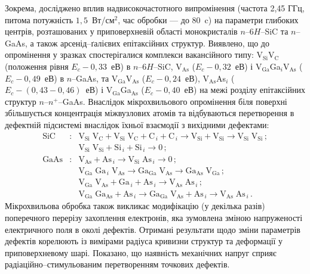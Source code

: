 Зокрема, досліджено вплив надвисокочастотного випромінення (частота 2,45 ГГц, питома потужність  $1,5$~Вт/см$^2$, час обробки --- до 80~c) на параметри глибоких центрів, розташованих у приповерхневій області монокристалів $n$--6$H$--SiC та $n$--GaAs, а також арсенід--ґалієвих епітаксійних структур.
Виявлено, що до опромінення у зразках спостерігалися комплекси вакансійного типу:
%
V$_\text{Si}$V$_\text{C}$ (положення рівня $E_c-0,33$~еВ) в $n$--6$H$--SiC,
V$_\text{As}$ ($E_c-0,32$~еВ) і V$_\text{Ga}$Ga$_i$V$_\text{As}$ ($E_c-0,49$~еВ) в $n$--GaAs,
та V$_\text{Ga}$V$_\text{As}$ ($E_c-0,24$~еВ), V$_\text{As}$As$_i$ ($E_c-(0,43-0,46)$~еВ) і
 V$_\text{Ga}$Ga$_\text{As}$ ($E_c-0,40$~еВ) на межі розділу епітаксійних структур $n$--$n^+$--GaAs.
Внаслідок мікрохвильового опромінення біля поверхні збільшується концентрація міжвузлових атомів та відбуваються перетворення в дефектній
підсистемі внаслідок їхньої взаємодії з вихідними дефектами:
\begin{eqnarray*}
  \text{SiC}&:&\text{V}_\text{Si}\;\text{V}_\text{C}+\text{V}_\text{Si}\;\text{V}_\text{C}+\text{C}_{\,i}+ \text{C}_{\,i} \rightarrow \text{V}_\text{Si}+ \text{V}_\text{Si}\rightarrow \text{V}_\text{Si}\;\text{V}_\text{Si}\,;\\
  &&\text{V}_\text{Si}\;\text{V}_\text{Si}+\text{Si}_{\,i}+ \text{Si}_{\,i} \rightarrow 0\,;\\
  \text{GaAs}&:&\text{V}_\text{As}+ \text{As}_{\,i} \rightarrow\text{V}_\text{Si}\;\text{As}_{\,i} \rightarrow 0\,;\\
   &&  \text{V}_\text{Ga}\;\text{Ga}_{\,i}\;\text{V}_\text{As}\rightarrow \text{Ga}_\text{Ga}\;\text{V}_\text{As}
  \rightarrow \text{Ga}_\text{As}\;\text{V}_\text{Ga} \,;\\
  &&\text{V}_\text{Ga}\;\text{V}_\text{As}+\text{Ga}_{\,i}+\text{As}_{\,i} \rightarrow \text{V}_\text{As}\;\text{As}_{\,i}\,;\\
  &&  \text{V}_\text{Ga}\;\text{Ga}_\text{As}+\text{As}_{\,i} \rightarrow
  \text{Ga}_\text{Ga}\;\text{V}_\text{As}+\text{As}_{\,i} \rightarrow
  \text{V}_\text{As}\;\text{As}_{\,i}\,.
\end{eqnarray*}
Мікрохвильова обробка також викликає модифікацію (у декілька разів) поперечного перерізу захоплення електронів,
яка зумовлена зміною напруженості електричного поля в околі дефектів.
Отримані результати щодо зміни параметрів дефектів корелюють із вимірами радіуса кривизни структур та деформації у приповерхневому шарі.
Показано, що наявність механічних напруг сприяє радіаційно--стимульованим перетворенням точкових дефектів.


